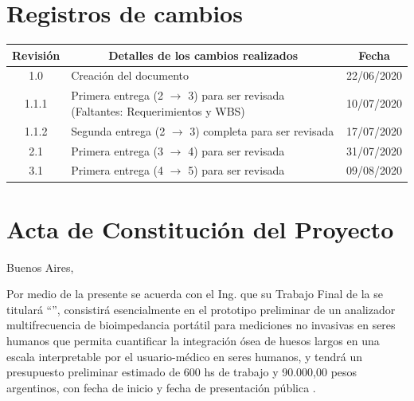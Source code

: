 \documentclass[11pt]{charter}
\begin{document}
\maketitle
\thispagestyle{empty}
\pagebreak


\thispagestyle{empty}
{\setlength{\parskip}{0pt}
\tableofcontents{}
}
\pagebreak


\section{Registros de cambios}
\label{sec:registro}


\begin{table}[ht]
\label{tab:registro}
\centering

\begin{tabularx}{\linewidth}{@{}|c|X|c|@{}}
\hline
\rowcolor[HTML]{C0C0C0} 
Revisión & \multicolumn{1}{c|}{\cellcolor[HTML]{C0C0C0}Detalles de los cambios realizados} & Fecha      \\ \hline
1.0      & Creación del documento                                                          & 22/06/2020 \\ \hline
1.1.1      & Primera entrega (2 $\rightarrow$ 3) para ser revisada (Faltantes: Requerimientos y WBS) & 10/07/2020 \\ \hline
1.1.2      & Segunda entrega (2 $\rightarrow$ 3) completa para ser revisada  & 17/07/2020 \\ \hline
2.1      & Primera entrega (3 $\rightarrow$ 4) para ser revisada  & 31/07/2020 \\ \hline
3.1      & Primera entrega (4 $\rightarrow$ 5) para ser revisada  & 09/08/2020 \\ \hline

\end{tabularx}
\end{table}

\pagebreak


\section{Acta de Constitución del Proyecto}
\label{sec:acta}

\begin{flushright}
Buenos Aires, \fechaInicioName
\end{flushright}

\vspace{2cm}

Por medio de la presente se acuerda con el Ing. \authorname\hspace{1px} que su Trabajo Final de la \degreename\hspace{1px} se titulará ``\ttitle'', consistirá esencialmente en el prototipo preliminar de un analizador multifrecuencia de bioimpedancia portátil para mediciones no invasivas en seres humanos que permita cuantificar la integración ósea de huesos largos en una escala interpretable por el usuario-médico en seres humanos, y tendrá un presupuesto preliminar estimado de 600 hs de trabajo y 90.000,00 pesos argentinos, con fecha de inicio \fechaInicioName\hspace{1px} y fecha de presentación pública \fechaFinalName.
\end{document}
